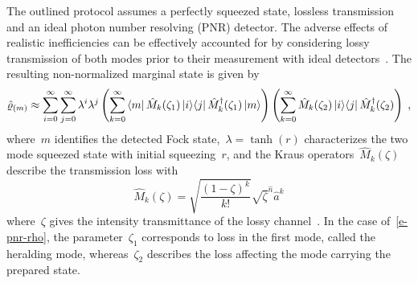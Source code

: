 \documentclass{article}
\begin{document}
The outlined protocol assumes a perfectly squeezed state, lossless transmission and an ideal photon number resolving (PNR) detector. The adverse effects of realistic inefficiencies can be effectively accounted for by considering lossy transmission of both modes prior to their measurement with ideal detectors~\cite{feito2009}.
%
The resulting non-normalized marginal state is given by
%
\begin{equation}\label{e-pnr-rho}
  \hatrho_{(m)} \approx
  \sum_{i = 0}^{\infty} 
  \sum_{j = 0}^{\infty}
    \lambda^{i} \lambda^{j}
    \left(
      \sum_{k = 0}^{\infty}
        \bra{m} \hat{M}_{k} (\zeta_{1}) \ketbra{i}{j} \hat{M}_{k}^{\dagger} (\zeta_{1}) \ket{m}
    \right)
    \left(
      \sum_{k = 0}^{\infty}
        \hat{M}_{k}(\zeta_{2}) \ketbra{i}{j} \hat{M}_{k}^{\dagger} (\zeta_{2})
    \right) \Qc
\end{equation}
%
where~$m$ identifies the detected Fock state,~${\lambda = \tanh(r)}$ characterizes the two mode squeezed state with initial squeezing~$r$, and the Kraus operators~${\hat{M}_{k} (\zeta)}$ describe the transmission loss with
%
\begin{equation}
  \hat{M}_{k} (\zeta) =
    \sqrt{ \frac{(1 - \zeta)^{k}}{k!} } 
    \sqrt{\zeta}^{\hat{n}} \hat{a}^{k}
\end{equation}
%
where~$\zeta$ gives the intensity transmittance of the lossy channel~\cite{ivan2011}. In the case of~\eqref{e-pnr-rho}, the parameter~$\zeta_{1}$ corresponds to loss in the first mode, called the heralding mode, whereas~$\zeta_{2}$ describes the loss affecting the mode carrying the prepared state.
\end{document}
